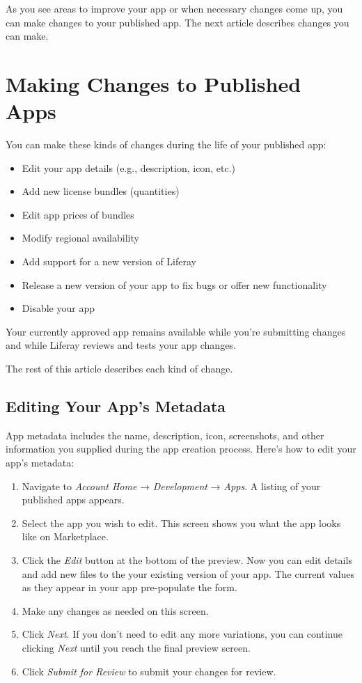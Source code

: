 As you see areas to improve your app or when necessary changes come up,
you can make changes to your published app. The next article describes
changes you can make.

\section{Making Changes to Published
Apps}\label{making-changes-to-published-apps}

You can make these kinds of changes during the life of your published
app:

\begin{itemize}
\tightlist
\item
  Edit your app details (e.g., description, icon, etc.)
\item
  Add new license bundles (quantities)
\item
  Edit app prices of bundles
\item
  Modify regional availability
\item
  Add support for a new version of Liferay
\item
  Release a new version of your app to fix bugs or offer new
  functionality
\item
  Disable your app
\end{itemize}

Your currently approved app remains available while you're submitting
changes and while Liferay reviews and tests your app changes.

The rest of this article describes each kind of change.

\subsection{Editing Your App's
Metadata}\label{editing-your-apps-metadata}

App metadata includes the name, description, icon, screenshots, and
other information you supplied during the app creation process. Here's
how to edit your app's metadata:

\begin{enumerate}
\def\labelenumi{\arabic{enumi}.}
\item
  Navigate to \emph{Account Home} → \emph{Development} → \emph{Apps}. A
  listing of your published apps appears.
\item
  Select the app you wish to edit. This screen shows you what the app
  looks like on Marketplace.
\item
  Click the \emph{Edit} button at the bottom of the preview. Now you can
  edit details and add new files to the your existing version of your
  app. The current values as they appear in your app pre-populate the
  form.
\item
  Make any changes as needed on this screen.
\item
  Click \emph{Next}. If you don't need to edit any more variations, you
  can continue clicking \emph{Next} until you reach the final preview
  screen.
\item
  Click \emph{Submit for Review} to submit your changes for review.
\end{enumerate}

